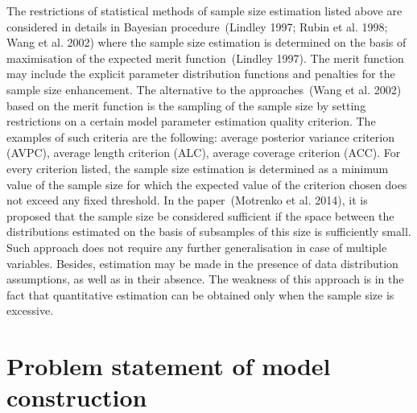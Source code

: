 \documentclass[
11pt,%
tightenlines,%
twoside,%
onecolumn,%
nofloats,%
nobibnotes,%
nofootinbib,%
superscriptaddress,%
noshowpacs,%
centertags]%
{revtex4}
\begin{document}
The restrictions of statistical methods of sample size estimation listed above are considered in details in Bayesian procedure~(Lindley 1997; Rubin et al. 1998; Wang et al. 2002) where the sample size estimation is determined on the basis of maximisation of the expected merit function~(Lindley 1997). The merit function may include the explicit parameter distribution functions and penalties for the sample size enhancement. The alternative to the approaches~(Wang et al. 2002) based on the merit function is the sampling of the sample size by setting restrictions on a certain model parameter estimation quality criterion. The examples of such criteria are the following: average  posterior variance criterion (AVPC), average length criterion (ALC), average coverage criterion (ACC). For every criterion listed, the sample size estimation is determined as a minimum value of the sample size for which the expected value of the criterion chosen does not exceed any fixed threshold. In the paper~(Motrenko et al. 2014), it is proposed that the sample size be considered sufficient  if the space between the distributions estimated on the basis of subsamples of this size is sufficiently small. Such approach does not require any further generalisation in case of multiple variables. Besides, estimation may be made in the presence of data distribution assumptions, as well as in their absence. The weakness of this approach is in the fact that quantitative estimation can be obtained only when the sample size is excessive. 

\section{Problem statement of model construction}
\end{document}
